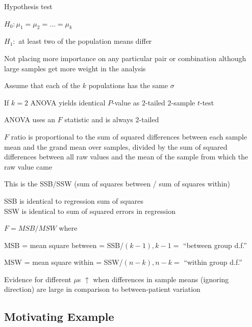 \bi 
\item Hypothesis test
  \bi
    \item $H_{0}: \mu_{1}=\mu_{2}=\ldots=\mu_{k}$
    \item $H_{1}:$ at least two of the population means differ
  \ei
\item Not placing more importance on any particular pair or
  combination although large samples get more weight in the analysis
\item Assume that each of the $k$ populations has the same $\sigma$
\item If $k=2$ ANOVA yields identical $P$-value as 2-tailed 2-sample
  $t$-test
\item ANOVA uses an $F$ statistic and is always 2-tailed
\item $F$ ratio is proportional to the sum of squared differences
  between each sample mean and the grand mean over samples, divided by
  the sum of squared differences between all raw values and the mean
  of the sample from which the raw value came
\item This is the SSB/SSW (sum of squares between / sum of squares
  within)
\item SSB is identical to regression sum of squares \\
 SSW is identical to sum of squared errors in regression
\item $F=MSB/MSW$ where
 \bi
 \item MSB = mean square between = SSB/$(k-1), k-1=$ ``between group
   d.f.''
 \item MSW = mean square within = SSW/$(n-k), n-k=$ ``within group
   d.f.''
 \item Evidence for different $\mu$s $\uparrow$ when differences in
   sample means (ignoring direction) are large in comparison to
   between-patient variation
 \ei
\ei

\subsection{Motivating Example}

